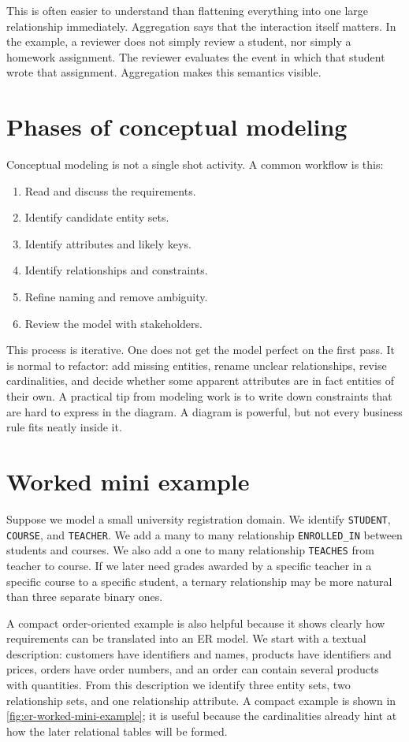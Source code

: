 \documentclass[11pt,a4paper,openany]{book}
\begin{document}
This is often easier to understand than flattening everything into one large relationship immediately. Aggregation says that the interaction itself matters. In the example, a reviewer does not simply review a student, nor simply a homework assignment. The reviewer evaluates the event in which that student wrote that assignment. Aggregation makes this semantics visible.

\section{Phases of conceptual modeling}
Conceptual modeling is not a single shot activity. A common workflow is this:

\begin{enumerate}
\item Read and discuss the requirements.
\item Identify candidate entity sets.
\item Identify attributes and likely keys.
\item Identify relationships and constraints.
\item Refine naming and remove ambiguity.
\item Review the model with stakeholders.
\end{enumerate}

This process is iterative. One does not get the model perfect on the first pass. It is normal to refactor: add missing entities, rename unclear relationships, revise cardinalities, and decide whether some apparent attributes are in fact entities of their own. A practical tip from modeling work is to write down constraints that are hard to express in the diagram. A diagram is powerful, but not every business rule fits neatly inside it.

\section{Worked mini example}
Suppose we model a small university registration domain. We identify \texttt{STUDENT}, \texttt{COURSE}, and \texttt{TEACHER}. We add a many to many relationship \texttt{ENROLLED\_IN} between students and courses. We also add a one to many relationship \texttt{TEACHES} from teacher to course. If we later need grades awarded by a specific teacher in a specific course to a specific student, a ternary relationship may be more natural than three separate binary ones.

A compact order-oriented example is also helpful because it shows clearly how requirements can be translated into an ER model. We start with a textual description: customers have identifiers and names, products have identifiers and prices, orders have order numbers, and an order can contain several products with quantities. From this description we identify three entity sets, two relationship sets, and one relationship attribute. A compact example is shown in \cref{fig:er-worked-mini-example}; it is useful because the cardinalities already hint at how the later relational tables will be formed.
\end{document}

